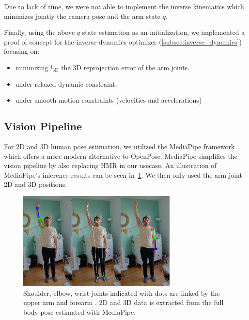 Due to lack of time, we were not able to implement the inverse kinematics which minimizes jointly
the camera pose and the arm state $q$.

Finally, using the above $q$ state estimation as an initialization,
we implemented a proof of concept for the inverse dynamics optimizer (\ref{subsec:inverse_dynamics}) focusing on:
\begin{itemize}
    \item minimizing $l_{\text{3D}}$ the 3D reprojection error of the arm joints.
    \item under relaxed dynamic constraint.
    \item under smooth motion constraints (velocities and accelerations)
\end{itemize}


\subsection{Vision Pipeline}
\label{subsec:vision_pipeline}

For 2D and 3D human pose estimation, we utilized the MediaPipe framework~\cite{lugaresi2019mediapipe}, which offers a more modern alternative 
to OpenPose. MediaPipe simplifies the vision pipeline by also replacing HMR in our usecase. An illustration of MediaPipe's inference results 
can be seen in~\cref{fig:mediapipe}. We then only used the arm joint 2D and 3D positions. 

\begin{figure}
    \centering
    \includegraphics[width=8cm]{figures/pose_detection_mediapipe_collage.png}
    \caption{
    \color{red}Shoulder, \color{darkgreen}elbow, \color{blue}wrist \color{black} joints indicated with dots
    are linked by the \color{darkgreen}upper arm \color{black} and \color{blue}forearm \color{black}. 2D and 3D data is extracted from
    the full body pose estimated with MediaPipe.
    }
    \label{fig:mediapipe}
\end{figure}

